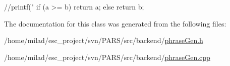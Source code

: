 \begin{DoxyCode}
                                   {
        //printf("%
        if (a >= b) {
                return a;
        } else {
                return b;
        }
}
\end{DoxyCode}


The documentation for this class was generated from the following files:\begin{DoxyCompactItemize}
\item 
/home/milad/esc\_\-project/svn/PARS/src/backend/\hyperlink{phraseGen_8h}{phraseGen.h}\item 
/home/milad/esc\_\-project/svn/PARS/src/backend/\hyperlink{phraseGen_8cpp}{phraseGen.cpp}\end{DoxyCompactItemize}
